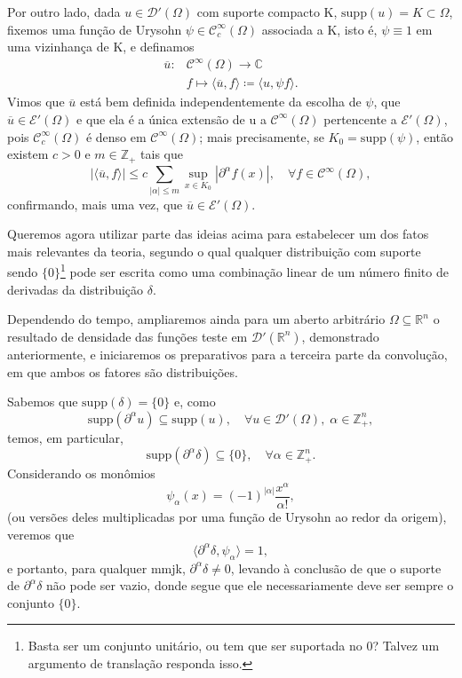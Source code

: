 \documentclass[../distribution_theory_notes.tex]{subfiles}
\begin{document}
Por outro lado, dada \(u\in \mathcal{D}'(\Omega )\) com suporte compacto K, \(\mathrm{supp}(u)=K\subset \Omega \), fixemos uma função de Urysohn \(\psi \in \mathcal{C}_{c}^{\infty}(\Omega )\) associada a K, isto é, \(\psi \equiv 1\) em uma vizinhança de K, e definamos
\begin{align*}
	\overline{u}: & \mathcal{C}^{\infty}(\Omega )\longrightarrow \mathbb{C}                         \\
	              & f\longmapsto \langle \overline{u}, f\rangle \coloneqq \langle u, \psi f\rangle.
\end{align*}
Vimos que \(\overline{u}\) está bem definida independentemente da escolha de \(\psi \), que \(\overline{u}\in \mathcal{E}'(\Omega )\) e que ela é a única extensão de u a \(\mathcal{C}^{\infty}(\Omega )\) pertencente a \(\mathcal{E}'(\Omega )\), pois \(\mathcal{C}_{c}^{\infty}(\Omega )\) é denso em \(\mathcal{C}^{\infty}(\Omega )\); mais precisamente, se \(K_{0}=\mathrm{supp}(\psi )\), então existem \(c>0\) e \(m\in \mathbb{Z}_{+}\) tais que
\[
	|\langle \overline{u}, f\rangle |\leq c\sum\limits_{|\alpha |\leq m}^{}\sup_{x\in K_{0}}|\partial^{\alpha }f(x)|,\quad \forall f\in \mathcal{C}^{\infty}(\Omega ),
\]
confirmando, mais uma vez, que \(\overline{u}\in \mathcal{E}'(\Omega )\).

Queremos agora utilizar parte das ideias acima para estabelecer um dos fatos mais relevantes da teoria, segundo o qual qualquer distribuição com suporte sendo \(\{0\}\)\footnote{Basta ser um conjunto unitário, ou tem que ser suportada no 0? Talvez um argumento de translação responda isso.} pode ser escrita como uma combinação linear de um número finito de derivadas da distribuição \(\delta \).

Dependendo do tempo, ampliaremos ainda para um aberto arbitrário \(\Omega \subseteq \mathbb{R}^{n}\) o resultado de densidade das funções teste em \(\mathcal{D}'(\mathbb{R}^{n})\), demonstrado anteriormente, e iniciaremos os preparativos para a terceira parte da convolução, em que ambos os fatores são distribuições.

Sabemos que \(\mathrm{supp}(\delta )=\{0\}\) e, como
\[
	\mathrm{supp}(\partial^{\alpha }u)\subseteq \mathrm{supp}(u),\quad \forall u\in \mathcal{D}'(\Omega ),\; \alpha \in \mathbb{Z}_{+}^{n},
\]
temos, em particular,
\[
	\mathrm{supp}(\partial^{\alpha }\delta )\subseteq \{0\},\quad \forall \alpha \in \mathbb{Z}_{+}^{n}.
\]
Considerando os monômios
\[
	\psi_{\alpha }(x)=(-1)^{|\alpha |}\frac{x^{\alpha }}{\alpha !},
\]
(ou versões deles multiplicadas por uma função de Urysohn ao redor da origem), veremos que
\[
	\langle \partial ^{\alpha }\delta , \psi_{\alpha } \rangle=1,
\]
e portanto, para qualquer mmjk, \(\partial^{\alpha }\delta \neq 0\), levando à conclusão de que o suporte de \(\partial^{\alpha }\delta \) não pode ser vazio, donde segue que ele necessariamente deve ser sempre o conjunto \(\{0\}\).
\end{document}
